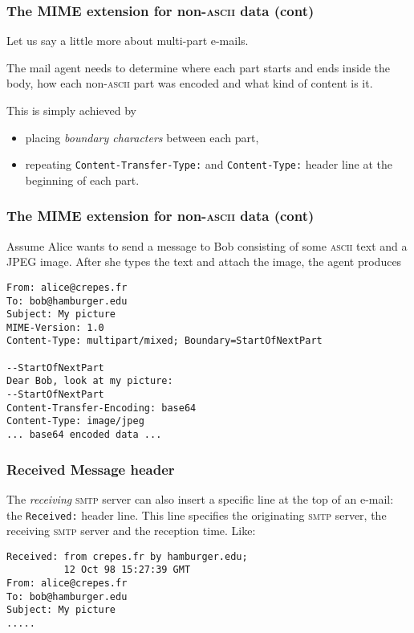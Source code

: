 %
\begin{frame}[containsverbatim]
\frametitle{The MIME extension for non-\textsc{ascii} data (cont)}

Let us say a little more about multi-part e-mails.

The mail agent needs to determine where each part starts and ends
inside the body, how each non-\textsc{ascii} part was encoded and what
kind of content is it. 

This is simply achieved by 
\begin{itemize}
  \item placing \emph{boundary characters} between each part,

  \item repeating \verb+Content-Transfer-Type:+ and 
   \verb+Content-Type:+ header line at the beginning of each part.

\end{itemize}

\end{frame}

%
\begin{frame}[containsverbatim]
\frametitle{The MIME extension for non-\textsc{ascii} data (cont)}

Assume Alice wants to send a message to Bob consisting of some
\textsc{ascii} text and a JPEG image. After she types the text and
attach the image, the agent produces
{\small
\begin{verbatim}
From: alice@crepes.fr
To: bob@hamburger.edu
Subject: My picture
MIME-Version: 1.0
Content-Type: multipart/mixed; Boundary=StartOfNextPart

--StartOfNextPart
Dear Bob, look at my picture:
--StartOfNextPart
Content-Transfer-Encoding: base64
Content-Type: image/jpeg
... base64 encoded data ...
\end{verbatim}
}

\end{frame}

%
\begin{frame}[containsverbatim]
\frametitle{Received Message header}

The \emph{receiving} \textsc{smtp} server can also insert a specific
line at the top of an e-mail: the \verb+Received:+ header line. This
line specifies the originating \textsc{smtp} server, the receiving
\textsc{smtp} server and the reception time. Like:
{\small
\begin{verbatim}
Received: from crepes.fr by hamburger.edu;
          12 Oct 98 15:27:39 GMT
From: alice@crepes.fr
To: bob@hamburger.edu
Subject: My picture
.....
\end{verbatim}
}

\end{frame}

